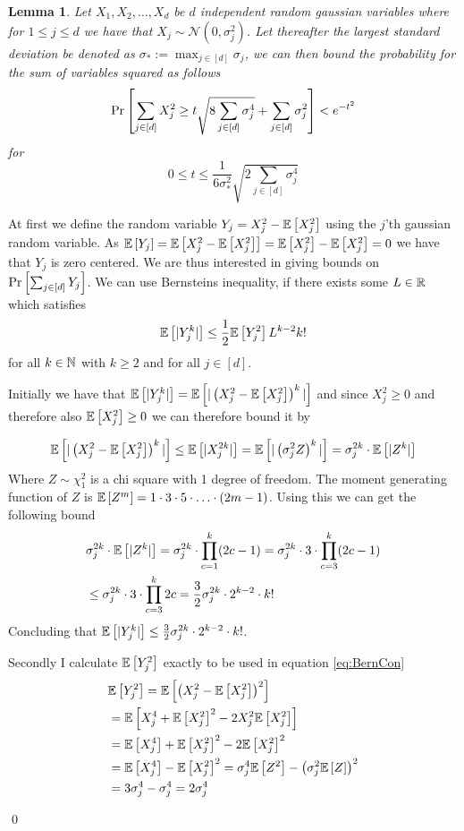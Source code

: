 \documentclass[a4paper,12pt]{article}
\renewenvironment{proof}{{\textit{Proof} \\}}{\qed}
\newtheorem{lemma}{Lemma}[section]
\begin{document}
\begin{lemma}
\label{lem:Bernstein}
Let $X_1, X_2, \dots , X_d$ be $d$ independent random gaussian variables 
where for $ 1 \le j \le d$ we have that $X_j \sim \mathcal{N}(0, \sigma_j^2)$.
Let thereafter the largest standard deviation be denoted as $\sigma_* := \max_{j \in [d]} \sigma_j$,
we can then bound the probability for the sum of variables squared as follows 
\[
\Pr\left [\sum_{j \in [d]} X_j^2  \ge 
    t \sqrt{8 \sum_{j \in [d]} \sigma_j^4} +
    \sum_{j \in [d]} \sigma_j^2  \right] < e^{-t^2}
\]
for
\[
0 \le t \le 
    \frac{1}{6 \sigma_*^2} \sqrt{2 \sum_{j \in [d]} \sigma_j^4}
\]
\end{lemma}
\begin{proof}
At first we define the random variable $Y_j = X_j^2 - \mathbb{E} \left [ X_j^2  \right]$ 
using the $j$'th gaussian random variable.
As $\mathbb{E} \left [ Y_j  \right] = \mathbb{E} \left [ X_j^2 - \mathbb{E} \left [ X_j^2  \right]  \right] = \mathbb{E} \left [ X_j^2  \right] - \mathbb{E} \left [ X_j^2  \right] = 0$ 
we have that $Y_j$ is zero centered. We are thus interested in giving bounds on
$\Pr\left [\sum_{j \in [d]} Y_j \right]$. 
We can use Bernsteins inequality, if there exists some $L \in \mathbb{R}$ which satisfies 
\begin{equation}
\label{eq:BernCon}
    \mathbb{E} \left [  |Y^k_j|   \right] \le \frac{1}{2} \mathbb{E} \left [ Y_j^2  \right] L^{k-2} k!
\end{equation}
for all $k \in \mathbb{N}$ with $k \ge 2$ and for all $j \in [d]$. \cite{wainwright_2019}

Initially we have that $\mathbb{E} \left [  |Y_j^k|   \right] = \mathbb{E} \left [  |\left (X_j^2 - \mathbb{E} \left [ X_j^2  \right]\right)^k|  \right]$
and since $X_j^2 \ge 0$ and therefore also $\mathbb{E} \left [ X_j^2  \right] \ge 0$ 
we can therefore bound it by

\[
    \mathbb{E} \left [  |\left (X_j^2 - \mathbb{E} \left [ X_j^2  \right]\right)^k|  \right] \le \mathbb{E} \left [  | X_j^{2k} |   \right] =
    \mathbb{E} \left [  | \left (\sigma_j^2 Z\right)^{k} |   \right] = 
    \sigma_j^{2k} \cdot \mathbb{E} \left [  |Z^{k} |   \right]
\]
Where $Z \sim \chi^2_1$ is a chi square with 1 degree of freedom.
The moment generating function of $Z$ is 
$\mathbb{E} \left [ Z^m  \right] = 1 \cdot 3 \cdot 5 \cdot \ldots \cdot (2m - 1) $.
Using this we can get the following bound
\begin{align*}
    &\sigma_j^{2k} \cdot \mathbb{E} \left [  |Z^{k} |   \right] =
    \sigma_j^{2k} \cdot \prod_{c=1}^k(2c-1) =
    \sigma_j^{2k} \cdot 3\cdot \prod_{c=3}^k (2c-1) \\
    &\le \sigma_j^{2k} \cdot 3 \cdot \prod_{c=3}^k 2c
    = \frac{3}{2}\sigma_j^{2k} \cdot 2^{k-2} \cdot k!
\end{align*}
Concluding that $\mathbb{E} \left [  |Y_j^k|   \right] \le \frac{3}{2}\sigma_j^{2k} \cdot 2^{k-2} \cdot k!$.

\noindent Secondly I calculate $\mathbb{E} \left [ Y_j^2  \right]$ exactly to be used in equation \eqref{eq:BernCon}
\begin{align}
\label{eq:ExpY2:1}
    &\mathbb{E} \left [ Y_j^2  \right] = 
    \mathbb{E} \left [ \left (X_j^2 - \mathbb{E} \left [ X_j^2  \right]\right)^2  \right] \\
    &=\mathbb{E} \left [ X_j^4 + \mathbb{E} \left [ X_j^2  \right]^2 - 2X_j^2\mathbb{E} \left [ X_j^2  \right]  \right] \\
    &=\mathbb{E} \left [ X_j^4  \right] + \mathbb{E} \left [ X_j^2  \right]^2 - 2\mathbb{E} \left [ X_j^2  \right]^2 \\
    &=\mathbb{E} \left [ X_j^4  \right]  - \mathbb{E} \left [ X_j^2  \right]^2 =
    \sigma_j^4\mathbb{E} \left [ Z^2  \right]  - \left (\sigma_j^2\mathbb{E} \left [ Z  \right]\right)^2 \\
\label{eq:ExpY2:2}
    &=3\sigma_j^4  - \sigma_j^4 =
    2\sigma_j^4
\end{align}


\end{proof}
\end{document}
